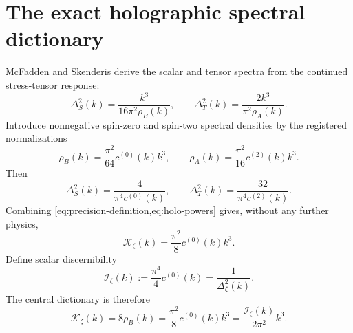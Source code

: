 \documentclass[11pt]{article}
\numberwithin{equation}{section}
\newcommand{\Iz}{\mathcal I_\zeta}
\newcommand{\Kz}{\mathcal K_\zeta}
\newcommand{\cz}{c^{(0)}}
\newcommand{\ct}{c^{(2)}}
\theoremstyle{definition}
\theoremstyle{remark}
\begin{document}
\section{The exact holographic spectral dictionary}
\label{sec:dictionary}

McFadden and Skenderis derive the scalar and tensor spectra from the continued stress-tensor response:
\begin{equation}
\boxed{
\Delta_S^2(k)=\frac{k^3}{16\pi^2\rho_B(k)},
\qquad
\Delta_T^2(k)=\frac{2k^3}{\pi^2\rho_A(k)}.}
\label{eq:MS}
\end{equation}
Introduce nonnegative spin-zero and spin-two spectral densities by the registered normalizations
\begin{equation}
\rho_B(k)=\frac{\pi^2}{64}\cz(k)k^3,
\qquad
\rho_A(k)=\frac{\pi^2}{16}\ct(k)k^3.
\label{eq:c-normalizations}
\end{equation}
Then
\begin{equation}
\boxed{
\Delta_S^2(k)=\frac{4}{\pi^4\cz(k)},
\qquad
\Delta_T^2(k)=\frac{32}{\pi^4\ct(k)}.}
\label{eq:holo-powers}
\end{equation}
Combining \cref{eq:precision-definition,eq:holo-powers} gives, without any further physics,
\begin{equation}
\boxed{
\Kz(k)=\frac{\pi^2}{8}\cz(k)k^3.}
\end{equation}
Define scalar discernibility
\begin{equation}
\boxed{\Iz(k):=\frac{\pi^4}{4}\cz(k)=\frac{1}{\Delta_\zeta^2(k)}.}
\end{equation}
The central dictionary is therefore
\begin{equation}
\boxed{
\Kz(k)
=8\rho_B(k)
=\frac{\pi^2}{8}\cz(k)k^3
=\frac{\Iz(k)}{2\pi^2}k^3.}
\label{eq:main-dictionary}
\end{equation}
\end{document}
